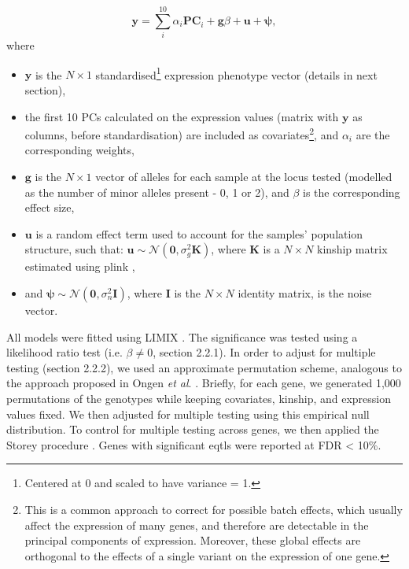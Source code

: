 \begin{equation}\label{eq:LMM_ipsc_eqtl}
    \mathbf{y} = \sum_i^{10}\alpha_i \mathbf{PC}_i + \mathbf{g}\beta + \mathbf{u} + \boldsymbol{\psi},  
\end{equation}
where 
\begin{itemize}
    \item $\mathbf{y}$ is the $N \times 1$ standardised\footnote{Centered at 0 and scaled to have variance = 1.} expression phenotype vector (details in next section),
    \item the first 10 PCs calculated on the expression values (matrix with $\mathbf{y}$ as columns, before standardisation) are included as covariates\footnote{This is a common approach to correct for possible batch effects, which usually affect the expression of many genes, and therefore are detectable in the principal components of expression. 
    Moreover, these global effects are orthogonal to the effects of a single variant on the expression of one gene.}, and $\alpha_i$ are the corresponding weights,
    \item $\mathbf{g}$ is the $N \times 1$ vector of alleles for each sample at the locus tested (modelled as the number of minor alleles present - 0, 1 or 2), and $\beta$ is the corresponding effect size,
    \item $\mathbf{u}$ is a random effect term used to account for the samples' population structure, such that: $\mathbf{u} \sim \mathcal{N}(\mathbf{0}, \sigma_g^2\mathbf{K})$, where $\mathbf{K}$ is a $N \times N$ kinship matrix estimated using plink \cite{purcell2007plink},
    \item and $\boldsymbol{\psi} \sim \mathcal{N}(\mathbf{0}, \sigma_n^2\mathbf{I})$, where $\mathbf{I}$ is the $N \times N$ identity matrix, is the noise vector.
\end{itemize}

\vspace{1.5mm}

\newpage

All models were fitted using LIMIX \cite{lippert2014limix, casale2015efficient}. 
The significance was tested using a likelihood ratio test (i.e. $\beta \neq 0$, section 
2.2.1).
In order to adjust for multiple testing (section
2.2.2), 
we used an approximate permutation scheme, analogous to the approach proposed in Ongen \textit{et al}. \cite{ongen2016fast}. 
Briefly, for each gene, we generated 1,000 permutations of the genotypes while keeping covariates, kinship, and expression values fixed. 
We then adjusted for multiple testing using this empirical null distribution.
To control for multiple testing across genes, we then applied the Storey procedure \cite{storey2003statistical}. 
Genes with significant \glspl{eqtl} were reported at FDR < 10\%.

